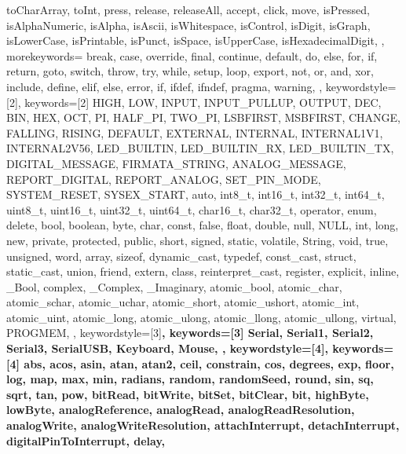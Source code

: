 {{			toCharArray, toInt, press, release, releaseAll, accept, click, move, 
			isPressed, isAlphaNumeric, isAlpha, isAscii, isWhitespace, isControl, 
			isDigit, isGraph, isLowerCase, isPrintable, isPunct, isSpace, 
			isUpperCase, isHexadecimalDigit, 
		}, 
		morekeywords={   %
			break, case, override, final, continue, default, do, else, for, 
			if, return, goto, switch, throw, try, while, setup, loop, export, 
			not, or, and, xor, include, define, elif, else, error, if, ifdef, 
			ifndef, pragma, warning,
		}, 
		keywordstyle=[2]\color{arduinoBlue},   
		keywords=[2]{   %
			HIGH, LOW, INPUT, INPUT_PULLUP, OUTPUT, DEC, BIN, HEX, OCT, PI, 
			HALF_PI, TWO_PI, LSBFIRST, MSBFIRST, CHANGE, FALLING, RISING, 
			DEFAULT, EXTERNAL, INTERNAL, INTERNAL1V1, INTERNAL2V56, LED_BUILTIN, 
			LED_BUILTIN_RX, LED_BUILTIN_TX, DIGITAL_MESSAGE, FIRMATA_STRING, 
			ANALOG_MESSAGE, REPORT_DIGITAL, REPORT_ANALOG, SET_PIN_MODE, 
			SYSTEM_RESET, SYSEX_START, auto, int8_t, int16_t, int32_t, int64_t, 
			uint8_t, uint16_t, uint32_t, uint64_t, char16_t, char32_t, operator, 
			enum, delete, bool, boolean, byte, char, const, false, float, double, 
			null, NULL, int, long, new, private, protected, public, short, 
			signed, static, volatile, String, void, true, unsigned, word, array, 
			sizeof, dynamic_cast, typedef, const_cast, struct, static_cast, union, 
			friend, extern, class, reinterpret_cast, register, explicit, inline, 
			_Bool, complex, _Complex, _Imaginary, atomic_bool, atomic_char, 
			atomic_schar, atomic_uchar, atomic_short, atomic_ushort, atomic_int, 
			atomic_uint, atomic_long, atomic_ulong, atomic_llong, atomic_ullong, 
			virtual, PROGMEM,
		},  
		keywordstyle=[3]\bfseries\color{arduinoOrange},
		keywords=[3]{  %
			Serial, Serial1, Serial2, Serial3, SerialUSB, Keyboard, Mouse,
		},      
		keywordstyle=[4]\color{arduinoOrange},
		keywords=[4]{  %
			abs, acos, asin, atan, atan2, ceil, constrain, cos, degrees, exp, 
			floor, log, map, max, min, radians, random, randomSeed, round, sin, 
			sq, sqrt, tan, pow, bitRead, bitWrite, bitSet, bitClear, bit, 
			highByte, lowByte, analogReference, analogRead, 
			analogReadResolution, analogWrite, analogWriteResolution, 
			attachInterrupt, detachInterrupt, digitalPinToInterrupt, delay, 
}}
